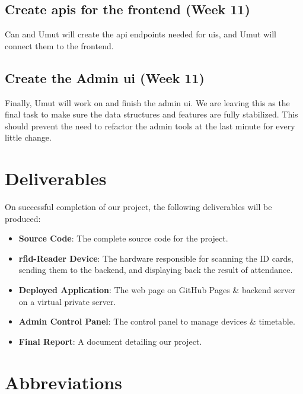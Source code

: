 \documentclass[12pt]{article}
\begin{document}
\subsection{Create \glspl{api} for the frontend (Week 11)}
Can and Umut will create the \gls{api} endpoints needed for \glspl{ui}, and Umut will connect them to the frontend.


\subsection{Create the Admin \gls{ui} (Week 11)}
Finally, Umut will work on and finish the admin \gls{ui}. We are leaving this as the final task to make sure the data structures and features are fully stabilized. This should prevent the need to refactor the admin tools at the last minute for every little change.



\section{Deliverables}
On successful completion of our project, the following deliverables will be produced:
\begin{itemize}
    \item \textbf{Source Code}: The complete source code for the project.
    \item \textbf{\gls{rfid}-Reader Device}: The hardware responsible for scanning the ID cards, sending them to the backend, and displaying back the result of attendance.
    \item \textbf{Deployed Application}: The web page on GitHub Pages \& backend server on a virtual private server.
    \item \textbf{Admin Control Panel}: The control panel to manage devices \& timetable.
    \item \textbf{Final Report}: A document detailing our project.
\end{itemize}



\newpage
\section{Abbreviations}
\begin{table}[H]
    \centering
    \printglossary[type=\acronymtype,style=gridtable,title=Abbreviations]
    \label{table:glossary}
\end{table}
\end{document}
